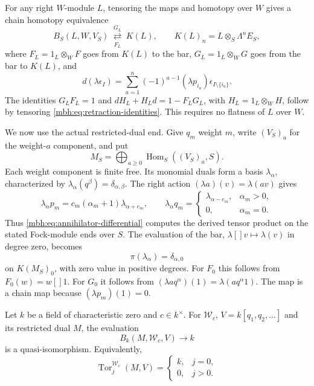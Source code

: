 For any right \(W\)-module \(L\), tensoring the maps and homotopy
over \(W\) gives a chain homotopy equivalence
\begin{equation}\label{mbh:eq:module-comparison}
 B_S(L,W,V_S)
 \ \underset{F_L}{\stackrel{G_L}{\rightleftarrows}}\
 K(L),\qquad
 K(L)_n=L\otimes_S\Lambda^n E_S,
\end{equation}
where \(F_L=1_L\otimes_WF\) goes from \(K(L)\) to the bar,
\(G_L=1_L\otimes_WG\) goes from the bar to \(K(L)\), and
\begin{equation}\label{mbh:eq:annihilator-differential}
 d(\lambda\epsilon_I)=
 \sum_{a=1}^n(-1)^{a-1}
       (\lambda p_{i_a})\epsilon_{I\setminus\{i_a\}}.
\end{equation}
The identities \(G_LF_L=1\) and
\(dH_L+H_Ld=1-F_LG_L\), with \(H_L=1_L\otimes_WH\),
follow by tensoring \eqref{mbh:eq:retraction-identities}.
This requires no flatness of \(L\) over \(W\).

We now use the actual restricted-dual end.  Give \(q_m\) weight
\(m\), write \((V_S)_a\) for the weight-\(a\) component, and put
\[
 M_S=\bigoplus_{a\ge0}\operatorname{Hom}_S((V_S)_a,S).
\]
Each weight component is finite free.  Its monomial duals form a
basis \(\lambda_\alpha\), characterized by
\(\lambda_\alpha(q^\beta)=\delta_{\alpha,\beta}\).
The right action \((\lambda a)(v)=\lambda(av)\) gives
\begin{equation}\label{mbh:eq:dual-actions}
 \lambda_\alpha p_m
     =c_m(\alpha_m+1)\lambda_{\alpha+e_m},
 \qquad
 \lambda_\alpha q_m=
 \begin{cases}
 \lambda_{\alpha-e_m},&\alpha_m>0,\\
 0,&\alpha_m=0.
 \end{cases}
\end{equation}
Thus \eqref{mbh:eq:annihilator-differential} computes the
derived tensor product on the stated Fock-module ends over \(S\).
The evaluation of the bar, \(\lambda[]v\mapsto\lambda(v)\)
in degree zero, becomes
\begin{equation}\label{mbh:eq:evaluation}
 \pi(\lambda_\alpha)=\delta_{\alpha,0}
\end{equation}
on \(K(M_S)_0\), with zero value in positive degrees.
For \(F_0\) this follows from \(F_0(w)=w[]1\).
For \(G_0\) it follows from
\((\lambda aq^\alpha)(1)=\lambda(aq^\alpha1)\).
The map is a chain map because \((\lambda p_m)(1)=0\).

\begin{theorem}
\label{mbh:thm:nonzero}
Let \(k\) be a field of characteristic zero and \(c\in k^\times\).
For \(\mathscr W_c\), \(V=k[q_1,q_2,\ldots]\) and its
restricted dual \(M\), the evaluation
\[
 B_k(M,\mathscr W_c,V)\longrightarrow k
\]
is a quasi-isomorphism.  Equivalently,
\[
 \operatorname{Tor}^{\mathscr W_c}_j(M,V)=
 \begin{cases}k,&j=0,\\0,&j>0.\end{cases}
\]
\end{theorem}


